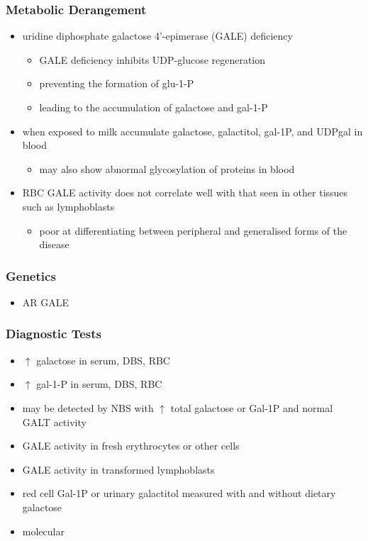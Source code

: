 \documentclass{scrartcl}
\begin{document}
\subsubsection{Metabolic Derangement}
\label{sec:org0e3ffdd}
\begin{itemize}
\item uridine diphosphate galactose 4’-epimerase (GALE) deficiency
\begin{itemize}
\item GALE deficiency inhibits UDP-glucose regeneration
\item preventing the formation of glu-1-P
\item leading to the accumulation of galactose and gal-1-P
\end{itemize}
\item when exposed to milk accumulate galactose, galactitol, gal-1P, and
UDPgal in blood
\begin{itemize}
\item may also show abnormal glycosylation of proteins in blood
\end{itemize}
\item RBC GALE activity does not correlate well with that seen in
other tissues such as lymphoblasts
\begin{itemize}
\item poor at differentiating between peripheral and generalised forms
of the disease
\end{itemize}
\end{itemize}

\subsubsection{Genetics}
\label{sec:org47cf5b1}
\begin{itemize}
\item AR GALE
\end{itemize}

\subsubsection{Diagnostic Tests}
\label{sec:orge7e6434}
\begin{itemize}
\item \(\uparrow\) galactose in serum, DBS, RBC
\item \(\uparrow\) gal-1-P in serum, DBS, RBC
\item may be detected by NBS with \(\uparrow\) total galactose or Gal-1P and normal GALT activity
\item GALE activity in fresh erythrocytes or other cells
\item GALE activity in transformed lymphoblasts
\item red cell Gal-1P or urinary galactitol measured with and without dietary galactose
\item molecular
\end{itemize}
\end{document}
